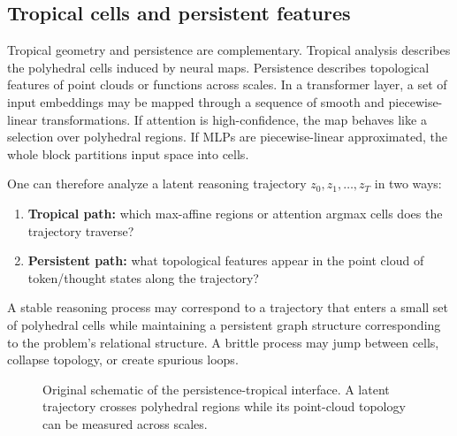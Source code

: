 \documentclass[11pt]{article}
\newcommand{\1}{\mathbf{1}}
\begin{document}
\subsection{Tropical cells and persistent features}

Tropical geometry and persistence are complementary. Tropical analysis describes the polyhedral cells induced by neural maps. Persistence describes topological features of point clouds or functions across scales. In a transformer layer, a set of input embeddings may be mapped through a sequence of smooth and piecewise-linear transformations. If attention is high-confidence, the map behaves like a selection over polyhedral regions. If MLPs are piecewise-linear approximated, the whole block partitions input space into cells.

One can therefore analyze a latent reasoning trajectory $z_0,z_1,\ldots,z_T$ in two ways:
\begin{enumerate}
\item \textbf{Tropical path:} which max-affine regions or attention argmax cells does the trajectory traverse?
\item \textbf{Persistent path:} what topological features appear in the point cloud of token/thought states along the trajectory?
\end{enumerate}
A stable reasoning process may correspond to a trajectory that enters a small set of polyhedral cells while maintaining a persistent graph structure corresponding to the problem's relational structure. A brittle process may jump between cells, collapse topology, or create spurious loops.

\begin{figure}[H]
\centering
{}
\caption{Original schematic of the persistence-tropical interface. A latent trajectory crosses polyhedral regions while its point-cloud topology can be measured across scales.}
\label{fig:tropical_persistence}
\end{figure}
\end{document}
